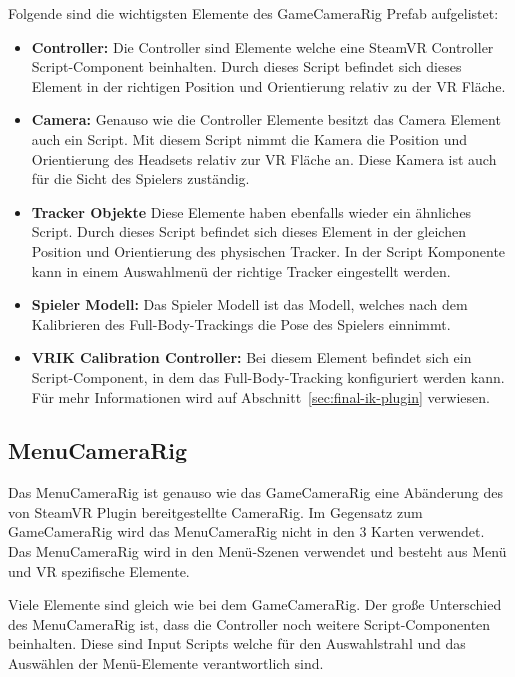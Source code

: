 Folgende sind die wichtigsten Elemente des GameCameraRig Prefab aufgelistet:

\begin{itemize}
    \item \textbf{Controller:} Die Controller sind Elemente welche eine SteamVR Controller Script-Component beinhalten.
    Durch dieses Script befindet sich dieses Element in der richtigen Position und Orientierung relativ zu der VR Fläche.
    \item \textbf{Camera:} Genauso wie die Controller Elemente besitzt das Camera Element auch ein Script.
    Mit diesem Script nimmt die Kamera die Position und Orientierung des Headsets relativ zur VR Fläche an.
    Diese Kamera ist auch für die Sicht des Spielers zuständig.
    \item \textbf{Tracker Objekte} Diese Elemente haben ebenfalls wieder ein ähnliches Script.
    Durch dieses Script befindet sich dieses Element in der gleichen Position und Orientierung des physischen Tracker.
    In der Script Komponente kann in einem Auswahlmenü der richtige Tracker eingestellt werden.
    \item \textbf{Spieler Modell:} Das Spieler Modell ist das Modell, welches nach dem Kalibrieren des Full-Body-Trackings die Pose des Spielers einnimmt.
    \item \textbf{VRIK Calibration Controller:} Bei diesem Element befindet sich ein Script-Component, in dem das Full-Body-Tracking konfiguriert werden kann.
    Für mehr Informationen wird auf Abschnitt~\ref{sec:final-ik-plugin} verwiesen.
\end{itemize}

\subsection{MenuCameraRig}\label{subsec:menu-camera-rig}

Das MenuCameraRig ist genauso wie das GameCameraRig eine Abänderung des von SteamVR Plugin bereitgestellte CameraRig.
Im Gegensatz zum GameCameraRig wird das MenuCameraRig nicht in den 3 Karten verwendet.
Das MenuCameraRig wird in den Menü-Szenen verwendet und besteht aus Menü und VR spezifische Elemente.

Viele Elemente sind gleich wie bei dem GameCameraRig.
Der große Unterschied des MenuCameraRig ist, dass die Controller noch weitere Script-Componenten beinhalten.
Diese sind Input Scripts welche für den Auswahlstrahl und das Auswählen der Menü-Elemente verantwortlich sind.

